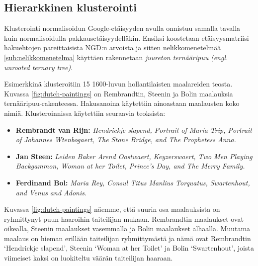 \documentclass[12pt,finnish]{tktltiki2}
\theoremstyle{definition}
\theoremstyle{remark}
\newcommand{\engl}[1]{\emph{(engl. #1)}}
\begin{document}
    \subsection{Hierarkkinen klusterointi} %
    \label{sub:klusterointi}
      Klusterointi normalisoidun Google-etäisyyden avulla onnistuu samalla tavalla kuin normalisoidulla pakkausetäisyydelläkin. Ensiksi koostetaan etäisyysmatriisi hakuehtojen pareittaisista NGD:n arvoista ja sitten nelikkomenetelmää \ref{sub:nelikkomenetelma} käyttäen rakennetaan \emph{juureton ternääripuu} \engl{unrooted ternary tree}.

      Esimerkkinä klusteroitiin 15 1600-luvun hollantilaisten maalareiden teosta.
      Kuvassa \ref{fig:dutch-paintings} on Rembrandtin, Steenin ja Bolin maalauksia ternääripuu-rakenteessa.
      Hakusanoina käytettiin ainoastaan maalausten koko nimiä. Klusteroinnissa käytettiin seuraavia teoksista:

      \begin{itemize}
        \item \textbf{Rembrandt van Rijn:} \emph{Hendrickje slapend, Portrait of Maria Trip, Portrait of Johannes Wtenbogaert, The Stone Bridge, and The Prophetess Anna.}
        \item \textbf{Jan Steen:} \emph{Leiden Baker Arend Oostwaert, Keyzerswaert, Two Men Playing Backgammon, Woman at her Toilet, Prince’s Day, and The Merry Family.}
        \item \textbf{Ferdinand Bol:} \emph{Maria Rey, Consul Titus Manlius Torquatus, Swartenhout, and Venus and Adonis.}
      \end{itemize}

      Kuvassa \ref{fig:dutch-paintings} näemme, että suurin osa maalauksista on ryhmittynyt puun haaroihin taiteilijan mukaan. Rembrandtin maalaukset ovat oikealla, Steenin maalaukset vasemmalla ja Bolin maalaukset alhaalla. Muutama maalaus on hieman erillään taiteilijan ryhmittymästä ja nämä ovat Rembrandtin `Hendrickje slapend', Steenin `Woman at her Toilet' ja  Bolin `Swartenhout', joista viimeiset kaksi on luokiteltu väärän taiteilijan haaraan.
\end{document}
